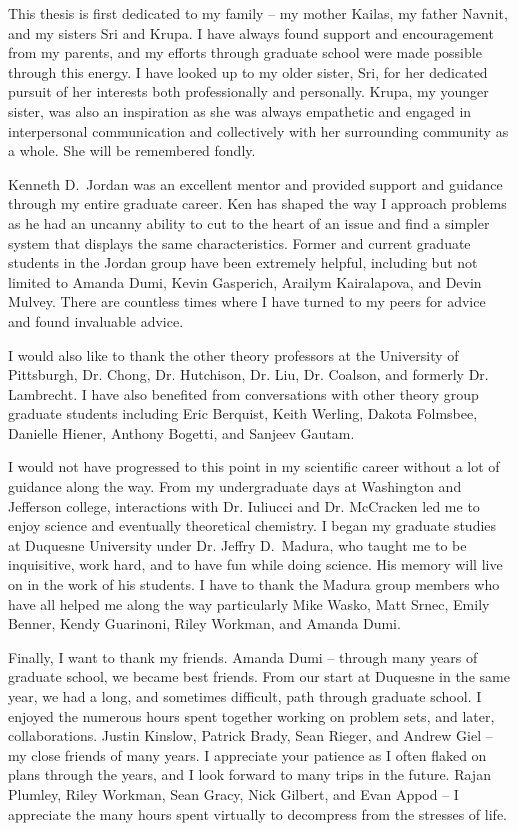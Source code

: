 This thesis is first dedicated to my family -- my mother Kailas, my father Navnit, and my sisters Sri and Krupa.
I have always found support and encouragement from my parents, and my efforts through graduate school were made possible through this energy.
I have looked up to my older sister, Sri, for her dedicated pursuit of her interests both professionally and personally.
Krupa, my younger sister, was also an inspiration as she was always empathetic and engaged in interpersonal communication and collectively with her surrounding community as a whole.
She will be remembered fondly.

Kenneth D.~Jordan was an excellent mentor and provided support and guidance through my entire graduate career.
Ken has shaped the way I approach problems as he had an uncanny ability to cut to the heart of an issue and find a simpler system that displays the same characteristics.
Former and current graduate students in the Jordan group have been extremely helpful, including but not limited to Amanda Dumi, Kevin Gasperich, Arailym Kairalapova, and Devin Mulvey.
There are countless times where I have turned to my peers for advice and found invaluable advice.

I would also like to thank the other theory professors at the University of Pittsburgh, Dr. Chong, Dr. Hutchison, Dr. Liu, Dr. Coalson, and formerly Dr. Lambrecht.
I have also benefited from conversations with other theory group graduate students including Eric Berquist, Keith Werling, Dakota Folmsbee, Danielle Hiener, Anthony Bogetti, and Sanjeev Gautam.

I would not have progressed to this point in my scientific career without a lot of guidance along the way.
From my undergraduate days at Washington and Jefferson college, interactions with Dr. Iuliucci and Dr. McCracken led me to enjoy science and eventually theoretical chemistry.
I began my graduate studies at Duquesne University under Dr. Jeffry D.~Madura, who taught me to be inquisitive, work hard, and to have fun while doing science.
His memory will live on in the work of his students.
I have to thank the Madura group members who have all helped me along the way particularly Mike Wasko, Matt Srnec, Emily Benner, Kendy Guarinoni, Riley Workman, and Amanda Dumi.

Finally, I want to thank my friends.
Amanda Dumi -- through many years of graduate school, we became best friends.
From our start at Duquesne in the same year, we had a long, and sometimes difficult, path through graduate school.
I enjoyed the numerous hours spent together working on problem sets, and later, collaborations.
Justin Kinslow, Patrick Brady, Sean Rieger, and Andrew Giel -- my close friends of many years.
I appreciate your patience as I often flaked on plans through the years, and I look forward to many trips in the future.
Rajan Plumley, Riley Workman, Sean Gracy, Nick Gilbert, and Evan Appod -- I appreciate the many hours spent virtually to decompress from the stresses of life.
